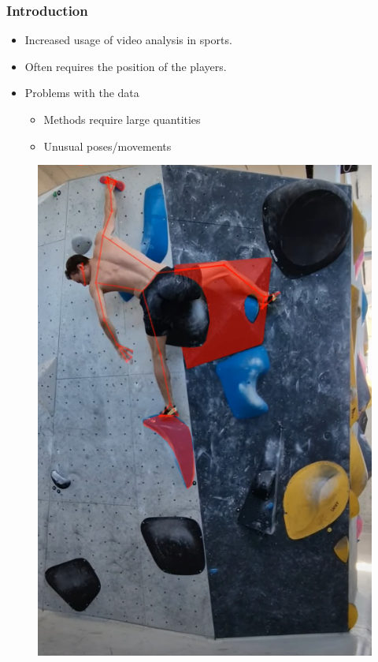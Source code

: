 \documentclass{beamer}
\begin{document}
\begin{frame}
    \frametitle{Introduction}
    \begin{minipage}{0.5\textwidth}
        \begin{itemize}
            \item<1-> Increased usage of video analysis in sports.
            \item<1-> Often requires the position of the players.
            \item<1-> Problems with the data
            \begin{itemize}
                \item Methods require large quantities
                \item Unusual poses/movements
            \end{itemize}
        \end{itemize}
    \end{minipage} \hfill
    \begin{minipage}{0.45\textwidth}
        \begin{figure}
            \center
            \includegraphics[width = \textwidth]{./entities/ClimbAlong_cv.PNG}
        \end{figure}
    \end{minipage}
\end{frame}
\end{document}
